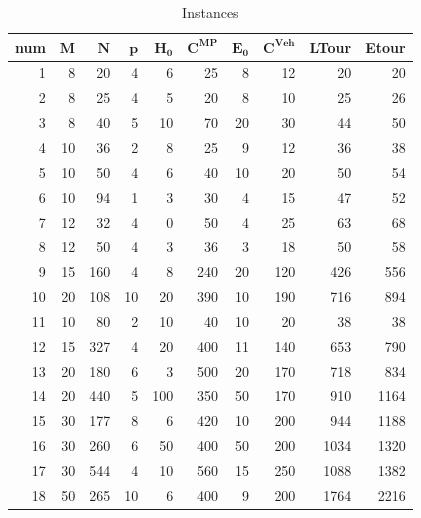 \documentclass[11pt]{article}
\theoremstyle{plain}%
\theoremstyle{definition} \newtheorem{lem}{Lemma}[section]
\theoremstyle{definition} \newtheorem{claim}{Claim}[lem]
\theoremstyle{definition} \newtheorem{theorem}{Theorem}[section]
\theoremstyle{definition} \newtheorem{exo}{Exercice n$^\circ$}
\theoremstyle{definition} \newtheorem{quest}{}[exo]
\theoremstyle{definition} \newtheorem{sousquest}{}[quest]
\theoremstyle{remark}
\theoremstyle{definition}
\begin{document}
\begin{table}[H]
  \centering
  \caption{Instances}
	\small{
    \begin{tabular}{|r|rrrrrrrrr|}
    \toprule
    \textbf{num} &$\mathbf{M}$ & $\mathbf{N}$ & $\mathbf{p}$ &  $\mathbf{H_0} $ & $\mathbf{C^{MP}}$ & $\mathbf{E_0}$ & $\mathbf{C^{Veh}}$ & \textbf{LTour} & \textbf{Etour} \\
    \midrule
    1&8     & 20    & 4        & 6     & 25    & 8     & 12    & 20    & 20 \\
   2& 8     & 25    & 4        & 5     & 20    & 8     & 10    & 25    & 26 \\
   3& 8     & 40    & 5       & 10    & 70    & 20    & 30    & 44    & 50 \\
    4     &10    & 36    & 2     &  8     & 25    & 9     & 12    & 36    & 38 \\
    5     &10    & 50    & 4     &  6     & 40    & 10    & 20    & 50    & 54 \\
    6     &10    & 94    & 1     &  3     & 30    & 4     & 15    & 47    & 52 \\
    7     &12    & 32    & 4     &  0     & 50    & 4     & 25    & 63    & 68 \\
    8     &12    & 50    & 4     &  3     & 36    & 3     & 18    & 50    & 58 \\
    9     &15    & 160   & 4     &  8     & 240   & 20    & 120   & 426   & 556 \\
    10    &20    & 108   & 10    &  20    & 390   & 10    & 190   & 716   & 894 \\
    11    &10    & 80    & 2     &  10    & 40    & 10    & 20    & 38    & 38 \\
    12    & 15    & 327   & 4     & 20    & 400   & 11    & 140   & 653   & 790 \\
    13    &20    & 180   & 6     &  3     & 500   & 20    & 170   & 718   & 834 \\
    14    &20    & 440   & 5     &  100   & 350   & 50    & 170   & 910   & 1164 \\
    15    &30    & 177   & 8     &  6     & 420   & 10    & 200   & 944   & 1188 \\
    16    &30    & 260   & 6     &  50    & 400   & 50    & 200   & 1034  & 1320 \\
    17    & 30    & 544   & 4     & 10    & 560   & 15    & 250   & 1088  & 1382 \\
    18    & 50    & 265   & 10    & 6     & 400   & 9     & 200   & 1764  & 2216 \\

\end{tabular}}
\end{table}
\end{document}
